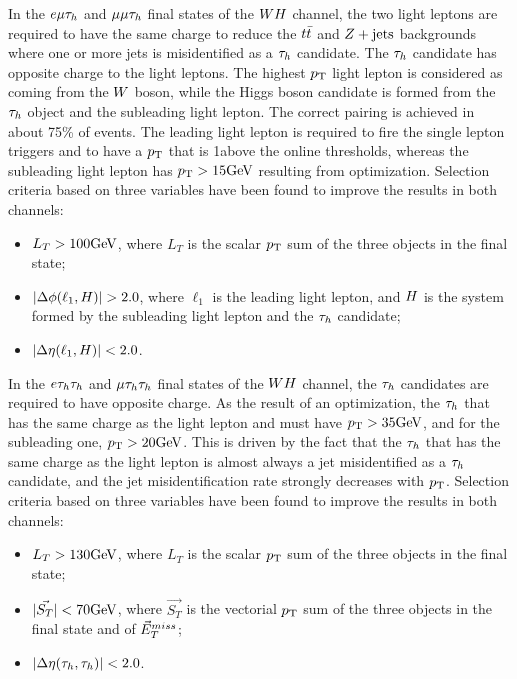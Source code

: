 In the $e\mu\tau_{h}$ and $\mu\mu\tau_{h}$ final states of the $WH$ channel, 
the two light leptons are required to have the same charge to reduce the $t\bar{t}$ 
and $Z+\textrm{jets}$ backgrounds where one or more jets is misidentified as a $\tau_{h}$ 
candidate. The $\tau_{h}$ candidate has opposite charge to the light leptons. The highest $p_\mathrm{T}$
light lepton is considered as coming from the $W$ boson, while the Higgs boson 
candidate is formed from the $\tau_{h}$ object and the subleading light lepton. The 
correct pairing is achieved in about 75\% of events. The leading light lepton is required 
to fire the single lepton triggers and to have a $p_\mathrm{T}$ that is 1\GeV above the online 
thresholds, whereas the subleading light lepton has $p_\mathrm{T}>15\mathrm{GeV}$ resulting from
optimization. Selection criteria based on three variables have been found to 
improve the results in both channels:
\begin{itemize}
\item $L_T>100\mathrm{GeV}$, where $L_T$ is the scalar $p_\mathrm{T}$ sum of the three objects in the final state;
\item $\lvert\Delta\phi(\ell_1,H)\rvert>2.0$, where $\ell_1$ is the leading light lepton, and 
$H$ is the system formed by the subleading light lepton and the $\tau_{h}$ candidate;
\item $\lvert\Delta\eta(\ell_1,H)\rvert<2.0$.
\end{itemize}


In the $e\tau_{h}\tau_{h}$ and $\mu\tau_{h}\tau_{h}$ final states of the $WH$ channel, 
the $\tau_{h}$ candidates are required to have opposite charge. As the result 
of an optimization, the $\tau_{h}$ that has the same charge as the light lepton and must 
have $p_\mathrm{T} > 35\mathrm{GeV}$, and for the subleading one, $p_\mathrm{T} > 20\mathrm{GeV}$. This is driven 
by the fact that the $\tau_{h}$ that has the same charge as the light lepton is almost 
always a jet misidentified as a $\tau_{h}$ candidate, and the jet misidentification 
rate strongly decreases with $p_\mathrm{T}$. Selection criteria based on three variables 
have been found to improve the results in both channels:
\begin{itemize}
\item $L_T>130\mathrm{GeV}$, where $L_T$ is the scalar $p_\mathrm{T}$ sum of the three objects in the final state;
\item $\lvert\vec{S_T}\rvert<70\mathrm{GeV}$, where $\vec{S_T}$ is the vectorial $p_\mathrm{T}$ sum of the three objects in the final state and of $\vec{E}^{miss}_T$;
\item $\lvert\Delta\eta(\tau_{h},\tau_{h})\rvert<2.0$.
\end{itemize}



